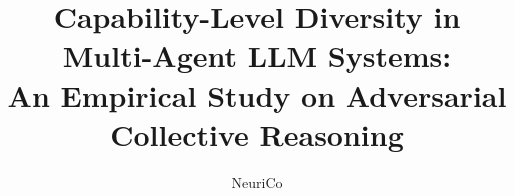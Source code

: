 \documentclass{article}
\title{Capability-Level Diversity in Multi-Agent LLM Systems:\\
An Empirical Study on Adversarial Collective Reasoning}
\author{NeuriCo}
\begin{document}
\maketitle

\begin{abstract}

\end{abstract}











\appendix

\end{document}
